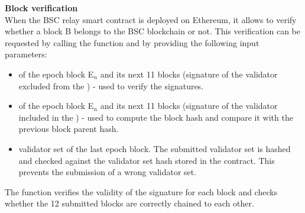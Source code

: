 \noindent
\textbf{Block verification}\\
When the BSC relay smart contract is deployed on Ethereum, it allows to verify whether a block B belongs to the BSC blockchain or not. This verification can be requested by calling the \verify function and by providing the following input parameters:
\begin{itemize}
	\item \rlph of the epoch block E$_n$ and its next 11 blocks (signature of the validator excluded from the \rlph) - used to verify the signatures. 
	\item \rlph of the epoch block E$_n$ and its next 11 blocks (signature of the validator included in the \rlph) - used to compute the block hash and compare it with the previous block parent hash.
	\item validator set of the last epoch block. The submitted validator set is hashed and checked against the validator set hash stored in the contract. This prevents the submission of a wrong validator set.
\end{itemize}
The \verify function verifies the validity of the signature for each block and checks whether the 12 submitted blocks are correctly chained to each other.
